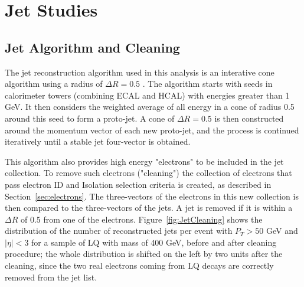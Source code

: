 %
\section{Jet Studies} \label{sec:jet}

\subsection{Jet Algorithm and Cleaning}

The jet reconstruction algorithm used in this analysis is an interative cone algorithm using a radius of $\Delta R=0.5$ \cite{JetAlg}.  
The algorithm starts with seeds in calorimeter towers (combining ECAL and HCAL) with energies greater than 
1 GeV. It then considers the weighted average of all energy in a cone of radius 0.5 around this seed to form a proto-jet.  
A cone of $\Delta R = 0.5$ is then constructed around the momentum vector of each new proto-jet,  
and the process is continued iteratively until a stable jet four-vector is obtained.


This algorithm also provides high energy "electrons" to be included in the jet collection. 
To remove such electrons ("cleaning") the collection of electrons that pass electron ID and Isolation 
selection criteria is created, as described in Section~\ref{sec:electrons}. The three-vectors of the 
electrons in this new collection is then compared to the three-vectors of the jets. 
A jet is removed if it is within a $\Delta R$ of 0.5 from one of the electrons. 
Figure~\ref{fig:JetCleaning} shows the distribution of the number of reconstructed jets 
per event with $P_{T}>50$ GeV and $|\eta|<3$ for a sample of LQ with mass of 400 GeV, before and after cleaning procedure; 
the whole distribution is shifted on the left by two units after the cleaning, since the two real electrons 
coming from LQ decays are correctly removed from the jet list. 

